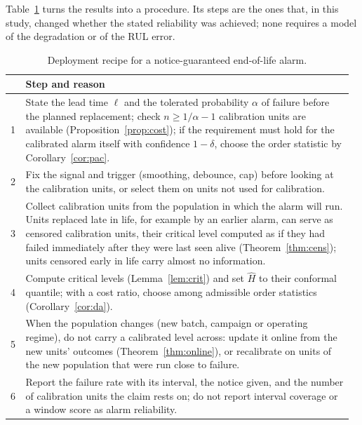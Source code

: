 Table~\ref{tab:recipe} turns the results into a procedure. Its steps are the ones that, in this study, changed whether the stated reliability was achieved; none requires a model of the degradation or of the RUL error.

\begin{table}[t]\footnotesize\setlength{\tabcolsep}{3pt}
\caption{Deployment recipe for a notice-guaranteed end-of-life alarm.}\label{tab:recipe}
\begin{tabular}{@{}p{0.04\linewidth}p{0.93\linewidth}@{}}
\toprule
& Step and reason \\
\midrule
1 & State the lead time $\ell$ and the tolerated probability $\alpha$ of failure before the planned replacement; check $n\ge1/\alpha-1$ calibration units are available (Proposition~\ref{prop:cost}); if the requirement must hold for the calibrated alarm itself with confidence $1-\delta$, choose the order statistic by Corollary~\ref{cor:pac}. \\
2 & Fix the signal and trigger (smoothing, debounce, cap) before looking at the calibration units, or select them on units not used for calibration. \\
3 & Collect calibration units from the population in which the alarm will run. Units replaced late in life, for example by an earlier alarm, can serve as censored calibration units, their critical level computed as if they had failed immediately after they were last seen alive (Theorem~\ref{thm:cens}); units censored early in life carry almost no information. \\
4 & Compute critical levels (Lemma~\ref{lem:crit}) and set $\hat H$ to their conformal quantile; with a cost ratio, choose among admissible order statistics (Corollary~\ref{cor:da}). \\
5 & When the population changes (new batch, campaign or operating regime), do not carry a calibrated level across: update it online from the new units' outcomes (Theorem~\ref{thm:online}), or recalibrate on units of the new population that were run close to failure. \\
6 & Report the failure rate with its interval, the notice given, and the number of calibration units the claim rests on; do not report interval coverage or a window score as alarm reliability. \\
\bottomrule
\end{tabular}
\end{table}
